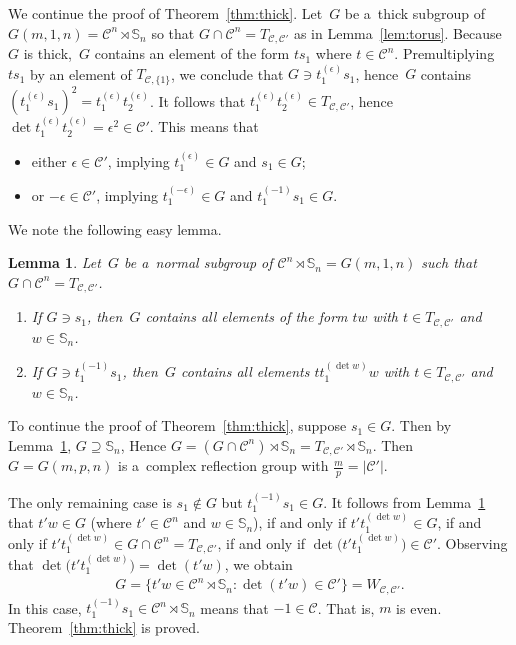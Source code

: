 \documentclass[pdftex]{sigma}
\newtheorem{Lemma}[Theorem]{Lemma}
\begin{document}
We continue the proof of Theorem~\ref{thm:thick}.
Let~$G$ be a~thick subgroup of $G(m,1,n)={\mathcal C}^n\rtimes \mathbb S_n$ so that $G\cap {\mathcal C}^n=T_{{\mathcal
C},{\mathcal C}'}$ as in Lemma~\ref{lem:torus}.
Because~$G$ is thick,~$G$ contains an element of the form $ts_1$ where $t\in {\mathcal C}^n$.
Premultiplying $ts_1$ by an element of $T_{{\mathcal C},\{1\}}$, we conclude that $G\ni t_1^{(\epsilon)}s_1$, hence~$G$
contains $(t_1^{(\epsilon)}s_1)^2=t_1^{(\epsilon)}t_2^{(\epsilon)}$.
It follows that $t_1^{(\epsilon)}t_2^{(\epsilon)}\in T_{{\mathcal C},{\mathcal C}'}$, hence $\det
t_1^{(\epsilon)}t_2^{(\epsilon)} = \epsilon^2\in{\mathcal C}'$.
This means that
\begin{itemize}\itemsep=0pt
\item
either $\epsilon\in {\mathcal C}'$, implying $t_1^{(\epsilon)}\in G$ and $s_1\in G$;
\item
or $-\epsilon\in {\mathcal C}'$, implying $t_1^{(-\epsilon)}\in G$ and $t_1^{(-1)}s_1\in G$.
\end{itemize}
We note the following easy lemma.

\begin{Lemma}
\label{lem:obvious}
Let~$G$ be a~normal subgroup of ${\mathcal C}^n\rtimes \mathbb S_n=G(m,1,n)$ such that $G\cap {\mathcal C}^n =
T_{{\mathcal C},{\mathcal C}'}$.
\begin{enumerate}\itemsep=0pt
\item[$(a)$] If $G\ni s_1$, then~$G$ contains all elements of the form $tw$ with $t\in T_{{\mathcal C},{\mathcal C}'}$ and $w\in
\mathbb S_n$.

\item[$(b)$] If $G\ni t_1^{(-1)}s_1$, then~$G$ contains all elements $tt_1^{(\det w)}w$ with $t\in T_{{\mathcal C},{\mathcal
C}'}$ and $w\in \mathbb S_n$.
\end{enumerate}
\end{Lemma}

To continue the proof of Theorem~\ref{thm:thick}, suppose $s_1\in G$.
Then by Lemma~\ref{lem:obvious}, $G\supseteq \mathbb S_n$, Hence $G=(G\cap {\mathcal C}^n)\rtimes \mathbb S_n
=T_{{\mathcal C},{\mathcal C}'}\rtimes \mathbb S_n$.
Then $G=G(m,p,n)$ is a~complex ref\/lection group with $\frac mp=|{\mathcal C}'|$.

The only remaining case is $s_1\notin G$ but $t_1^{(-1)}s_1 \in G$.
It follows from Lemma~\ref{lem:obvious} that $t'w\in G$ (where $t'\in {\mathcal C}^n$ and $w\in \mathbb S_n$), if and
only if $t' t_1^{(\det w)}\in G$, if and only if $t' t_1^{(\det w)}\in G\cap {\mathcal C}^n = T_{{\mathcal C},{\mathcal
C}'}$, if and only if $\det \big(t' t_1^{(\det w)}\big)\in {\mathcal C}'$.
Observing that $\det \big(t' t_1^{(\det w)}\big)=\det(t'w)$, we obtain
\begin{gather*}
G = \{ t'w\in {\mathcal C}^n \rtimes \mathbb S_n: \det(t'w)\in {\mathcal C}' \} = W_{{\mathcal C},{\mathcal C}'}.
\end{gather*}
In this case, $t_1^{(-1)}s_1\in {\mathcal C}^n \rtimes \mathbb S_n$ means that $-1\in{\mathcal C}$.
That is, $m$ is even.
Theorem~\ref{thm:thick} is proved.
\end{document}
